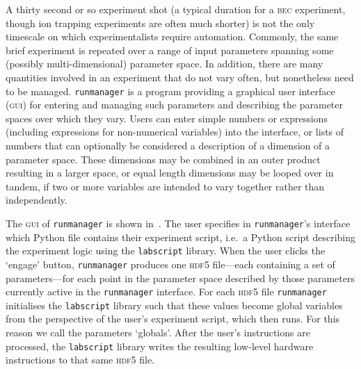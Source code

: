 A thirty second or so experiment shot (a typical duration for a \textsc{bec} experiment, though ion trapping experiments are often much shorter) is not the only timescale on which experimentalists require automation. Commonly, the same brief experiment is repeated over a range of input parameters spanning some (possibly multi-dimensional) parameter space. In addition, there are many quantities involved in an experiment that do not vary often, but nonetheless need to be managed. \texttt{runmanager} is a program providing a graphical user interface (\textsc{gui}) for entering and managing such parameters and describing the parameter spaces over which they vary. Users can enter simple numbers or expressions (including expressions for non-numerical variables) into the interface, or lists of numbers that can optionally be considered a description of a dimension of a parameter space. These dimensions may be combined in an outer product resulting in a larger space, or equal length dimensions may be looped over in tandem, if two or more variables are intended to vary together rather than independently.

The \textsc{gui} of \texttt{runmanager} is shown in~. The user specifies in \texttt{runmanager}'s interface which Python file contains their experiment script, i.e.~a Python script describing the experiment logic using the \texttt{labscript} library. When the user clicks the `engage' button, \texttt{runmanager} produces one \textsc{hdf5} file---each containing a set of parameters---for each point in the parameter space described by those parameters currently active in the \texttt{runmanager} interface. For each \textsc{hdf5} file \texttt{runmanager} initialises the \texttt{labscript} library such that these values become global variables from the perspective of the user's experiment script, which then runs. For this reason we call the parameters `globals'. After the user's instructions are processed, the \texttt{labscript} library writes the resulting low-level hardware instructions to that same \textsc{hdf5} file.

